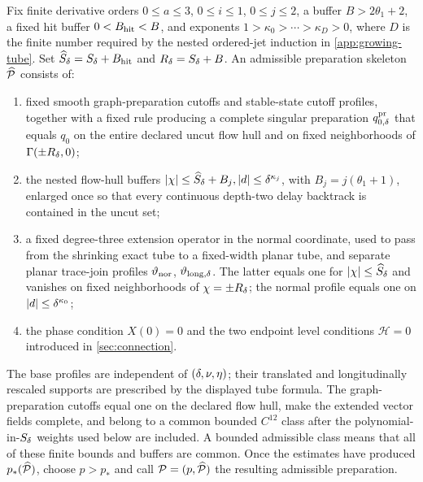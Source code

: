 \begin{definition}
\label{def:admissible-preparation}
Fix finite derivative orders \(0\le a\le3\),
\(0\le i\le1\), \(0\le j\le2\), a buffer
\(B>2\theta_1+2\), a fixed hit buffer
\(0<B_{\rm hit}<B\), and exponents
\(1>\kappa_0>\cdots>\kappa_D>0\), where \(D\) is the finite number required
by the nested ordered-jet induction in \cref{app:growing-tube}.  Set
\(\widehat S_\delta=S_\delta+B_{\rm hit}\) and
\(R_\delta=S_\delta+B\).  An admissible
preparation skeleton \(\widehat{\mathcal P}\) consists of:
\begin{enumerate}[label=\textup{(\roman*)}]
\item fixed smooth graph-preparation cutoffs and stable-state cutoff
      profiles, together with a fixed rule producing a complete singular
      preparation \(q_{0,\delta}^{\rm pr}\) that equals \(q_0\) on the entire
      declared uncut flow hull and on fixed neighborhoods of
      \(\Gamma(\pm R_\delta,0)\);
\item the nested flow-hull buffers
\(
 |\chi|\le \widehat S_\delta+B_j, |d|\le\delta^{\kappa_j}
\), with \(B_j=j(\theta_1+1)\), enlarged once so that every continuous
depth-two delay backtrack is contained in the uncut set;
\item a fixed degree-three extension operator in the normal coordinate,
      used to pass from the shrinking exact tube to a fixed-width planar
      tube, and separate planar trace-join profiles
      \(\vartheta_{\rm nor}\), \(\vartheta_{{\rm long},\delta}\).  The latter
      equals one for \(\left\lvert \chi\right\rvert\le\widehat S_\delta\) and vanishes on fixed
      neighborhoods of \(\chi=\pm R_\delta\); the normal profile equals one
      on \(\left\lvert d\right\rvert\le\delta^{\kappa_0}\);
\item the phase condition \(X(0)=0\) and the two endpoint level conditions
\(\mathscr H=0\) introduced in \cref{sec:connection}.
\end{enumerate}
The base profiles are independent of \((\delta,\nu,\eta)\); their translated
and longitudinally rescaled supports are prescribed by the displayed tube
formula.  The graph-preparation cutoffs equal one on the declared flow hull,
make the extended vector fields complete, and belong to a common bounded
\(C^{12}\) class after the polynomial-in-\(S_\delta\) weights used below are
included.  A bounded admissible class means that
all of these finite bounds and buffers are common.  Once the estimates have
produced \(p_*(\widehat{\mathcal P})\), choose \(p>p_*\) and call
\(\mathcal P=(p,\widehat{\mathcal P})\) the resulting admissible preparation.
\end{definition}


